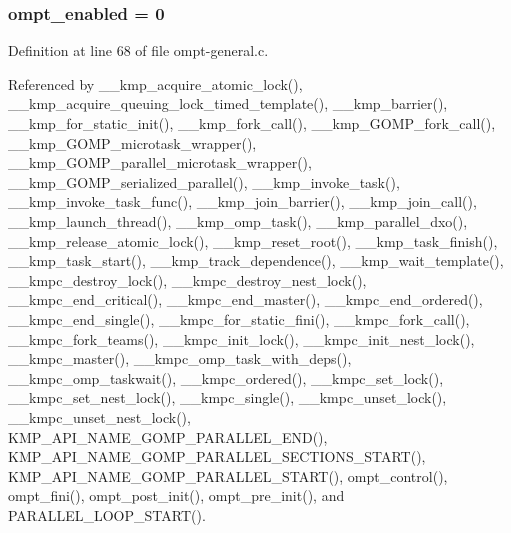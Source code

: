 \hypertarget{ompt-general_8c_a966b31b6d05f79f5495f8d8e71732f68}{
\subsubsection[{ompt\-\_\-enabled}]{ ompt\-\_\-enabled = 0}}\label{ompt-general_8c_a966b31b6d05f79f5495f8d8e71732f68}


Definition at line 68 of file ompt-\/general.\-c.



Referenced by \-\_\-\-\_\-kmp\-\_\-acquire\-\_\-atomic\-\_\-lock(), \-\_\-\-\_\-kmp\-\_\-acquire\-\_\-queuing\-\_\-lock\-\_\-timed\-\_\-template(), \-\_\-\-\_\-kmp\-\_\-barrier(), \-\_\-\-\_\-kmp\-\_\-for\-\_\-static\-\_\-init(), \-\_\-\-\_\-kmp\-\_\-fork\-\_\-call(), \-\_\-\-\_\-kmp\-\_\-\-G\-O\-M\-P\-\_\-fork\-\_\-call(), \-\_\-\-\_\-kmp\-\_\-\-G\-O\-M\-P\-\_\-microtask\-\_\-wrapper(), \-\_\-\-\_\-kmp\-\_\-\-G\-O\-M\-P\-\_\-parallel\-\_\-microtask\-\_\-wrapper(), \-\_\-\-\_\-kmp\-\_\-\-G\-O\-M\-P\-\_\-serialized\-\_\-parallel(), \-\_\-\-\_\-kmp\-\_\-invoke\-\_\-task(), \-\_\-\-\_\-kmp\-\_\-invoke\-\_\-task\-\_\-func(), \-\_\-\-\_\-kmp\-\_\-join\-\_\-barrier(), \-\_\-\-\_\-kmp\-\_\-join\-\_\-call(), \-\_\-\-\_\-kmp\-\_\-launch\-\_\-thread(), \-\_\-\-\_\-kmp\-\_\-omp\-\_\-task(), \-\_\-\-\_\-kmp\-\_\-parallel\-\_\-dxo(), \-\_\-\-\_\-kmp\-\_\-release\-\_\-atomic\-\_\-lock(), \-\_\-\-\_\-kmp\-\_\-reset\-\_\-root(), \-\_\-\-\_\-kmp\-\_\-task\-\_\-finish(), \-\_\-\-\_\-kmp\-\_\-task\-\_\-start(), \-\_\-\-\_\-kmp\-\_\-track\-\_\-dependence(), \-\_\-\-\_\-kmp\-\_\-wait\-\_\-template(), \-\_\-\-\_\-kmpc\-\_\-destroy\-\_\-lock(), \-\_\-\-\_\-kmpc\-\_\-destroy\-\_\-nest\-\_\-lock(), \-\_\-\-\_\-kmpc\-\_\-end\-\_\-critical(), \-\_\-\-\_\-kmpc\-\_\-end\-\_\-master(), \-\_\-\-\_\-kmpc\-\_\-end\-\_\-ordered(), \-\_\-\-\_\-kmpc\-\_\-end\-\_\-single(), \-\_\-\-\_\-kmpc\-\_\-for\-\_\-static\-\_\-fini(), \-\_\-\-\_\-kmpc\-\_\-fork\-\_\-call(), \-\_\-\-\_\-kmpc\-\_\-fork\-\_\-teams(), \-\_\-\-\_\-kmpc\-\_\-init\-\_\-lock(), \-\_\-\-\_\-kmpc\-\_\-init\-\_\-nest\-\_\-lock(), \-\_\-\-\_\-kmpc\-\_\-master(), \-\_\-\-\_\-kmpc\-\_\-omp\-\_\-task\-\_\-with\-\_\-deps(), \-\_\-\-\_\-kmpc\-\_\-omp\-\_\-taskwait(), \-\_\-\-\_\-kmpc\-\_\-ordered(), \-\_\-\-\_\-kmpc\-\_\-set\-\_\-lock(), \-\_\-\-\_\-kmpc\-\_\-set\-\_\-nest\-\_\-lock(), \-\_\-\-\_\-kmpc\-\_\-single(), \-\_\-\-\_\-kmpc\-\_\-unset\-\_\-lock(), \-\_\-\-\_\-kmpc\-\_\-unset\-\_\-nest\-\_\-lock(), K\-M\-P\-\_\-\-A\-P\-I\-\_\-\-N\-A\-M\-E\-\_\-\-G\-O\-M\-P\-\_\-\-P\-A\-R\-A\-L\-L\-E\-L\-\_\-\-E\-N\-D(), K\-M\-P\-\_\-\-A\-P\-I\-\_\-\-N\-A\-M\-E\-\_\-\-G\-O\-M\-P\-\_\-\-P\-A\-R\-A\-L\-L\-E\-L\-\_\-\-S\-E\-C\-T\-I\-O\-N\-S\-\_\-\-S\-T\-A\-R\-T(), K\-M\-P\-\_\-\-A\-P\-I\-\_\-\-N\-A\-M\-E\-\_\-\-G\-O\-M\-P\-\_\-\-P\-A\-R\-A\-L\-L\-E\-L\-\_\-\-S\-T\-A\-R\-T(), ompt\-\_\-control(), ompt\-\_\-fini(), ompt\-\_\-post\-\_\-init(), ompt\-\_\-pre\-\_\-init(), and P\-A\-R\-A\-L\-L\-E\-L\-\_\-\-L\-O\-O\-P\-\_\-\-S\-T\-A\-R\-T().

